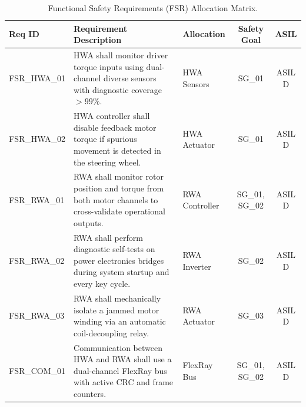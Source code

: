 \begin{table}[H]
    \centering
    \small
    \caption{Functional Safety Requirements (FSR) Allocation Matrix.}
    \label{tab:fsr}
    \begin{tabularx}{\linewidth}{p{1.6cm} X l c c}
        \toprule
        \textbf{Req ID} & \textbf{Requirement Description} & \textbf{Allocation} & \textbf{Safety Goal} & \textbf{ASIL} \\
        \midrule
        FSR\_HWA\_01 & HWA shall monitor driver torque inputs using dual-channel diverse sensors with diagnostic coverage \(> 99\%\). & HWA Sensors & SG\_01 & ASIL D \\
        FSR\_HWA\_02 & HWA controller shall disable feedback motor torque if spurious movement is detected in the steering wheel. & HWA Actuator & SG\_01 & ASIL D \\
        FSR\_RWA\_01 & RWA shall monitor rotor position and torque from both motor channels to cross-validate operational outputs. & RWA Controller & SG\_01, SG\_02 & ASIL D \\
        FSR\_RWA\_02 & RWA shall perform diagnostic self-tests on power electronics bridges during system startup and every key cycle. & RWA Inverter & SG\_02 & ASIL D \\
        FSR\_RWA\_03 & RWA shall mechanically isolate a jammed motor winding via an automatic coil-decoupling relay. & RWA Actuator & SG\_03 & ASIL D \\
        FSR\_COM\_01 & Communication between HWA and RWA shall use a dual-channel FlexRay bus with active CRC and frame counters. & FlexRay Bus & SG\_01, SG\_02 & ASIL D \\
        \bottomrule
    \end{tabularx}
\end{table}

